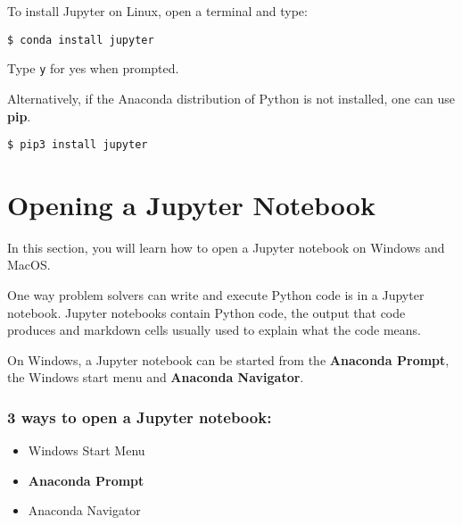 \documentclass{book}
\newcommand{\passthrough}[1]{#1}
\begin{document}
To install Jupyter on Linux, open a terminal and type:

\begin{lstlisting}
$ conda install jupyter
\end{lstlisting}

Type \passthrough{\lstinline!y!} for yes when prompted.

Alternatively, if the Anaconda distribution of Python is not installed,
one can use \textbf{pip}.

\begin{lstlisting}
$ pip3 install jupyter
\end{lstlisting}
    




    
        \hypertarget{opening-a-jupyter-notebook}{%
\section{Opening a Jupyter Notebook}\label{opening-a-jupyter-notebook}}
    




    
        In this section, you will learn how to open a Jupyter notebook on
Windows and MacOS.

One way problem solvers can write and execute Python code is in a
Jupyter notebook. Jupyter notebooks contain Python code, the output that
code produces and markdown cells usually used to explain what the code
means.

On Windows, a Jupyter notebook can be started from the \textbf{Anaconda
Prompt}, the Windows start menu and \textbf{Anaconda Navigator}.

\hypertarget{ways-to-open-a-jupyter-notebook}{%
\subsubsection{\texorpdfstring{3 ways to open a \textbf{Jupyter
notebook}:}{3 ways to open a Jupyter notebook:}}\label{ways-to-open-a-jupyter-notebook}}

\begin{itemize}
\item
  Windows Start Menu
\item
  \textbf{Anaconda Prompt}
\item
  Anaconda Navigator
\end{itemize}
    
\end{document}
